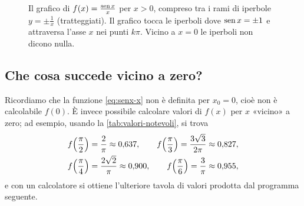 \begin{figure}[htb]
\centering
{}
\caption{Il grafico di $f(x)=\frac{\operatorname{sen} x}{x}$ per $x>0$, compreso tra i rami di iperbole
$y=\pm\frac1x$ (tratteggiati). Il grafico tocca le iperboli dove $\operatorname{sen} x=\pm1$ e
attraversa l'asse $x$ nei punti $k\pi$. Vicino a $x=0$ le iperboli non dicono nulla.}
\label{fig:senx-iperboli}
\end{figure}

\subsection{Che cosa succede vicino a zero?}

Ricordiamo che la funzione \eqref{eq:senx-x} non è definita per $x_{0}=0$, cioè non è
calcolabile $f(0)$. È invece possibile calcolare valori di $f(x)$ per $x$ «vicino» a
zero; ad esempio, usando la \cref{tab:valori-notevoli}, si trova
\begin{gather*}
  f\Bigl(\frac\pi2\Bigr)=\frac2\pi\approx0{,}637,\qquad
  f\Bigl(\frac\pi3\Bigr)=\frac{3\sqrt3}{2\pi}\approx0{,}827,\\
  f\Bigl(\frac\pi4\Bigr)=\frac{2\sqrt2}{\pi}\approx0{,}900,\qquad
  f\Bigl(\frac\pi6\Bigr)=\frac3\pi\approx0{,}955,
\end{gather*}
e con un calcolatore si ottiene l'ulteriore tavola di valori prodotta dal programma
seguente.


